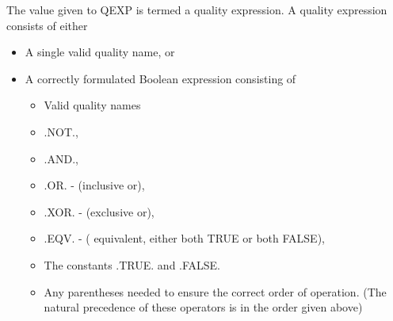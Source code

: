 \documentclass[twoside,11pt]{starlink}
\begin{document}
The value given to QEXP is termed a quality expression. A quality expression
consists of either
\begin{itemize}
\item A single valid quality name, or
\item A correctly formulated Boolean expression consisting of
\begin{itemize}
\item Valid quality names
\item .NOT.,
\item .AND.,
\item .OR.  - (inclusive or),
\item .XOR. - (exclusive or),
\item .EQV. - ( equivalent, either both TRUE or both FALSE),
\item The constants .TRUE. and .FALSE.
\item Any parentheses needed to ensure the correct order of operation. (The
natural precedence of these operators is in the order given above)
\end{itemize}
\end{itemize}
\end{document}
